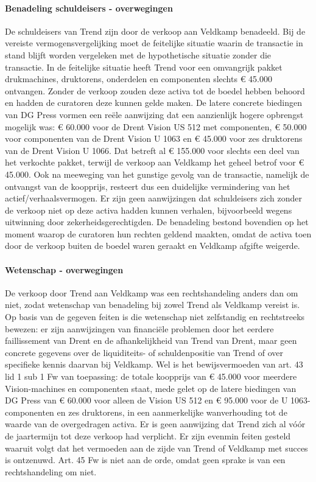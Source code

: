 \documentclass[
  dutch,
  a4paper,
]{article}
\begin{document}
\paragraph{Benadeling schuldeisers - overwegingen}\label{benadeling-schuldeisers---overwegingen-67}

De schuldeisers van Trend zijn door de verkoop aan Veldkamp benadeeld. Bij de vereiste vermogensvergelijking moet de feitelijke situatie waarin de transactie in stand blijft worden vergeleken met de hypothetische situatie zonder die transactie. In de feitelijke situatie heeft Trend voor een omvangrijk pakket drukmachines, druktorens, onderdelen en componenten slechts € 45.000 ontvangen. Zonder de verkoop zouden deze activa tot de boedel hebben behoord en hadden de curatoren deze kunnen gelde maken. De latere concrete biedingen van DG Press vormen een reële aanwijzing dat een aanzienlijk hogere opbrengst mogelijk was: € 60.000 voor de Drent Vision US 512 met componenten, € 50.000 voor componenten van de Drent Vision U 1063 en € 45.000 voor zes druktorens van de Drent Vision U 1066. Dat betreft al € 155.000 voor slechts een deel van het verkochte pakket, terwijl de verkoop aan Veldkamp het geheel betrof voor € 45.000. Ook na meeweging van het gunstige gevolg van de transactie, namelijk de ontvangst van de koopprijs, resteert dus een duidelijke vermindering van het actief/verhaalsvermogen. Er zijn geen aanwijzingen dat schuldeisers zich zonder de verkoop niet op deze activa hadden kunnen verhalen, bijvoorbeeld wegens uitwinning door zekerheidsgerechtigden. De benadeling bestond bovendien op het moment waarop de curatoren hun rechten geldend maakten, omdat de activa toen door de verkoop buiten de boedel waren geraakt en Veldkamp afgifte weigerde.

\paragraph{Wetenschap - overwegingen}\label{wetenschap---overwegingen-67}

De verkoop door Trend aan Veldkamp was een rechtshandeling anders dan om niet, zodat wetenschap van benadeling bij zowel Trend als Veldkamp vereist is. Op basis van de gegeven feiten is die wetenschap niet zelfstandig en rechtstreeks bewezen: er zijn aanwijzingen van financiële problemen door het eerdere faillissement van Drent en de afhankelijkheid van Trend van Drent, maar geen concrete gegevens over de liquiditeits- of schuldenpositie van Trend of over specifieke kennis daarvan bij Veldkamp. Wel is het bewijsvermoeden van art. 43 lid 1 sub 1 Fw van toepassing: de totale koopprijs van € 45.000 voor meerdere Vision-machines en componenten staat, mede gelet op de latere biedingen van DG Press van € 60.000 voor alleen de Vision US 512 en € 95.000 voor de U 1063-componenten en zes druktorens, in een aanmerkelijke wanverhouding tot de waarde van de overgedragen activa. Er is geen aanwijzing dat Trend zich al vóór de jaartermijn tot deze verkoop had verplicht. Er zijn evenmin feiten gesteld waaruit volgt dat het vermoeden aan de zijde van Trend of Veldkamp met succes is ontzenuwd. Art. 45 Fw is niet aan de orde, omdat geen sprake is van een rechtshandeling om niet.
\end{document}
